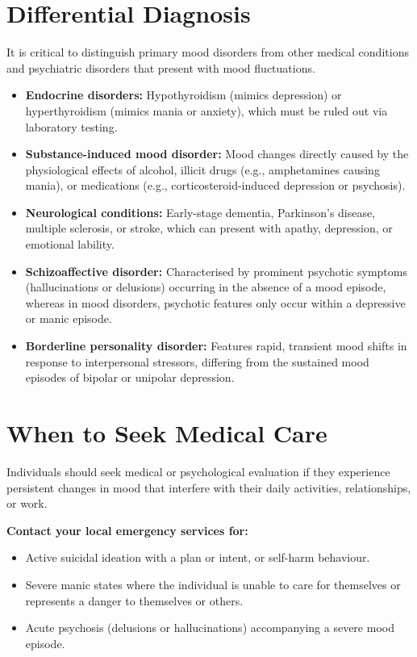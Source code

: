 \section*{Differential Diagnosis}
It is critical to distinguish primary mood disorders from other medical conditions and psychiatric disorders that present with mood fluctuations.
\begin{itemize}
    \item \textbf{Endocrine disorders:} Hypothyroidism (mimics depression) or hyperthyroidism (mimics mania or anxiety), which must be ruled out via laboratory testing.
    \item \textbf{Substance-induced mood disorder:} Mood changes directly caused by the physiological effects of alcohol, illicit drugs (e.g., amphetamines causing mania), or medications (e.g., corticosteroid-induced depression or psychosis).
    \item \textbf{Neurological conditions:} Early-stage dementia, Parkinson's disease, multiple sclerosis, or stroke, which can present with apathy, depression, or emotional lability.
    \item \textbf{Schizoaffective disorder:} Characterised by prominent psychotic symptoms (hallucinations or delusions) occurring in the absence of a mood episode, whereas in mood disorders, psychotic features only occur within a depressive or manic episode.
    \item \textbf{Borderline personality disorder:} Features rapid, transient mood shifts in response to interpersonal stressors, differing from the sustained mood episodes of bipolar or unipolar depression.
\end{itemize}

\section*{When to Seek Medical Care}
Individuals should seek medical or psychological evaluation if they experience persistent changes in mood that interfere with their daily activities, relationships, or work.

\textbf{Contact your local emergency services for:}
\begin{itemize}
    \item Active suicidal ideation with a plan or intent, or self-harm behaviour.
    \item Severe manic states where the individual is unable to care for themselves or represents a danger to themselves or others.
    \item Acute psychosis (delusions or hallucinations) accompanying a severe mood episode.
\end{itemize}

